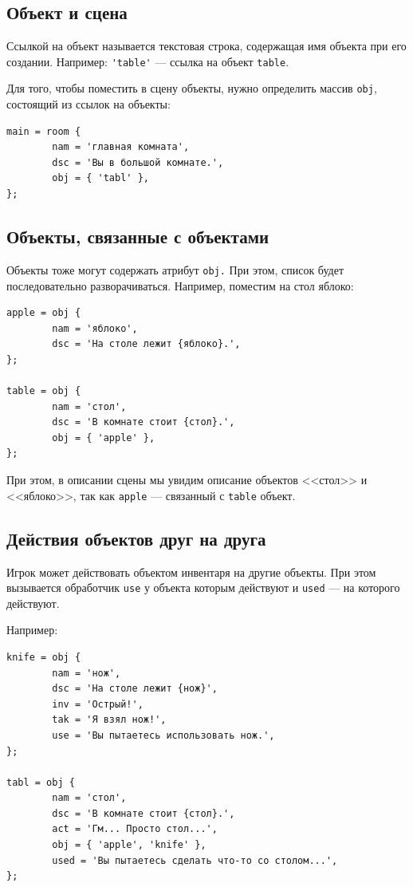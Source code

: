 \documentclass[a4paper,12pt]{article}
\begin{document}
\subsection{Объект и сцена}

Ссылкой на объект называется текстовая строка, содержащая имя объекта при его создании. Например: \verb/'table'/ --- ссылка на объект \verb/table/.

Для того, чтобы поместить в сцену объекты, нужно определить массив \verb/obj/, состоящий из ссылок на объекты:

\begin{verbatim}
main = room {
        nam = 'главная комната',
        dsc = 'Вы в большой комнате.',
        obj = { 'tabl' },
};
\end{verbatim}

\subsection{Объекты, связанные с объектами}


Объекты тоже могут содержать атрибут \verb/obj./ При этом, список будет последовательно разворачиваться. Например, поместим на стол яблоко:

\begin{verbatim}
apple = obj {
        nam = 'яблоко',
        dsc = 'На столе лежит {яблоко}.',
};

table = obj {
        nam = 'стол',
        dsc = 'В комнате стоит {стол}.',
        obj = { 'apple' },
};
\end{verbatim}

При этом, в описании сцены мы увидим описание объектов <<стол>> и <<яблоко>>, так как \verb/apple/ --- связанный с \verb/table/ объект.

\subsection{Действия объектов друг на друга}

Игрок может действовать объектом инвентаря на другие объекты. При этом вызывается обработчик \verb/use/ у объекта которым действуют и \verb/used/ --- на которого действуют.

Например:

\begin{verbatim}
knife = obj {
        nam = 'нож',
        dsc = 'На столе лежит {нож}',
        inv = 'Острый!',
        tak = 'Я взял нож!',
        use = 'Вы пытаетесь использовать нож.',
};

tabl = obj {
        nam = 'стол',
        dsc = 'В комнате стоит {стол}.',
        act = 'Гм... Просто стол...',
        obj = { 'apple', 'knife' },
        used = 'Вы пытаетесь сделать что-то со столом...',
};
\end{verbatim}
\end{document}
